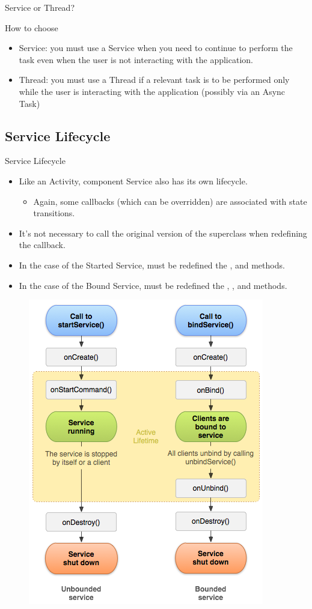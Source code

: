 \documentclass{beamer}
\begin{document}
  \begin{frame}{Service or Thread?}
    \begin{block}{How to choose}
      \begin{itemize}\itemsep20pt
        \item Service: you must use a Service when you need to continue to perform
        the task even when the user is not interacting with the application.
        \item Thread: you must use a Thread if a relevant task is to be performed
        only while the user is interacting with the application (possibly via an
        Async Task)
      \end{itemize}
    \end{block}
  \end{frame}

\subsection{Service Lifecycle}

  \begin{frame}[allowframebreaks]{Service Lifecycle}
    \begin{itemize}\itemsep10pt
      \item Like an Activity, component Service also has its own lifecycle.
      \begin{itemize}
        \item Again, some callbacks (which can be overridden) are associated
        with state transitions.
      \end{itemize}
      \item It's not necessary to call the original version of the superclass
      when redefining the callback.
      \item In the case of the Started Service, must be redefined the
      ,  and 
      methods.
      \item In the case of the Bound Service, must be redefined the
      , ,  and
       methods.
    \end{itemize}
    \begin{figure}
      \includegraphics[width=0.48\linewidth]{figures/service_lifecycle.png}
    \end{figure}
  \end{frame}
\end{document}
